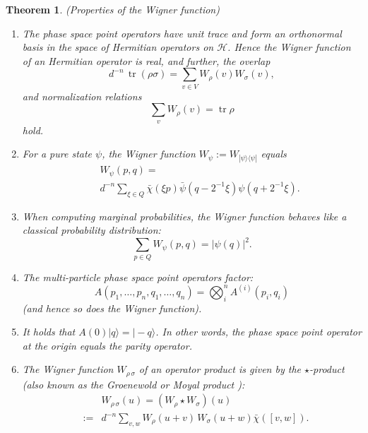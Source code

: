 \documentclass[aps,twocolumn,floatfix]{revtex4}
\newtheorem{theorem}{Theorem}
\def\ket#1.{|#1\rangle}
\def\bra#1.{\langle#1|}
\def\H{\mathcal{H}}
\DeclareMathOperator{\tr}{tr}
\begin{document}
\begin{theorem}\label{thWignerProperties}
	\emph{(Properties of the Wigner function)}

	\begin{enumerate}
		\label{wignerOrthonormal}
		\item
		The phase space point operators have unit trace and form an
		orthonormal basis in the space of Hermitian operators on $\H$.
		Hence the Wigner function of an Hermitian operator is real, and
		further, the \emph{overlap}
		\begin{equation*}
			d^{-n}\, \tr(\rho\sigma)
			= 
			\sum_{v\in V} W_\rho(v) W_\sigma(v),
		\end{equation*}
		and \emph{normalization} relations 
		\begin{equation*}
			\sum_v W_\rho(v) = \tr \rho
		\end{equation*}
		hold.

		\item\label{wignerPureState}
		For a pure state $\psi$, the Wigner function 
		$W_\psi:=W_{\ket\psi.\bra\psi.}$ equals
		\begin{eqnarray*}
			&&W_\psi(p,q) = \\
			&&d^{-n} \sum_{\xi\in Q} \bar\chi(\xi p) 
			\bar\psi(q-2^{-1} \xi)\psi(q+2^{-1} \xi).
		\end{eqnarray*}

		\item\label{wignerMarginal}
		When computing marginal probabilities, the Wigner function behaves
		like a classical probability distribution:
		\begin{equation*}
			\sum_{p\in Q} W_\psi(p,q)=|\psi(q)|^2.
		\end{equation*}

		\item\label{wignerFactor}
		The multi-particle phase space point operators factor: 
		\begin{equation*}
			A(p_1, \dots, p_n, q_1, \dots, q_n) 
			= \bigotimes_i^n A^{(i)}(p_i, q_i)
		\end{equation*}
		(and hence so does the Wigner function).

		\item\label{wignerParity}
		It holds that $A(0)\ket q.=\ket -q.$. In other words, the phase
		space point operator at the origin equals the \emph{parity
		operator}.

		\item\label{wignerMoyal}
		The Wigner function $W_{\rho\,\sigma}$ of an operator product  is
		given by the \emph{$\star$-product} (also known as the \emph{Groenewold} or
		\emph{Moyal product} \cite{groenewold}):
		\begin{eqnarray*}
			&& W_{\rho\,\sigma}(u)=(W_\rho \star W_\sigma)(u) \\
			&:=& d^{-n} \sum_{v,w} W_\rho(u+v) \, W_\sigma(u+w)
			\bar\chi([v,w]).
		\end{eqnarray*}
	\end{enumerate}
\end{theorem}
\end{document}
